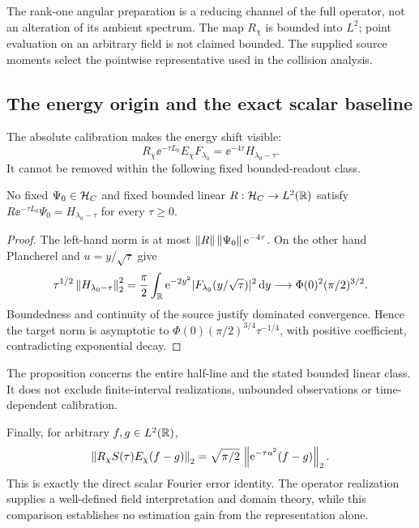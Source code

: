 The rank-one angular preparation is a reducing channel of the full
operator, not an alteration of its ambient spectrum. The map \(R_\chi\)
is bounded into \(L^2\); point evaluation on an arbitrary field is not
claimed bounded. The supplied source moments select the pointwise
representative used in the collision analysis.

\subsection{The energy origin and the exact scalar baseline}
The absolute calibration makes the energy shift visible:
\[
 R_\chi\ee^{-\tau L_0}E_\chi F_{\lambda_0}
 =\ee^{-4\tau}H_{\lambda_0-\tau}.
\]
It cannot be removed within the following fixed bounded-readout class.

\begin{proposition}\label{prop:unshifted}
No fixed \(\Psi_0\in\mathcal H_C\) and fixed bounded linear
\(R:\mathcal H_C\to L^2(\mathbb R)\) satisfy
\(R\ee^{-\tau L_0}\Psi_0=H_{\lambda_0-\tau}\) for every \(\tau\geq0\).
\end{proposition}
\begin{proof}
The left-hand norm is at most \(\left\lVert R\right\rVert\left\lVert\Psi_0\right\rVert\mathrm e^{-4\tau}\).
On the other hand Plancherel and \(u=y/\sqrt\tau\) give
\[
 \tau^{1/2}\left\lVert H_{\lambda_0-\tau}\right\rVert_2^2
 =\frac\pi2\int_\mathbb R\mathrm e^{-2y^2}
 |F_{\lambda_0}(y/\sqrt\tau)|^2\,\mathrm d y
 \longrightarrow\Phi(0)^2(\pi/2)^{3/2}.
\]
Boundedness and continuity of the source justify dominated convergence.
Hence the target norm is asymptotic to
\(\Phi(0)(\pi/2)^{3/4}\tau^{-1/4}\), with positive coefficient,
contradicting exponential decay.
\end{proof}
The proposition concerns the entire half-line and the stated bounded
linear class. It does not exclude finite-interval realizations,
unbounded observations or time-dependent calibration.

Finally, for arbitrary \(f,g\in L^2(\mathbb R)\),
\begin{equation}\label{eq:exact-error}
 \left\lVert R_\chi S(\tau)E_\chi(f-g)\right\rVert_2
 =\sqrt{\pi/2}\,\left\lVert\mathrm e^{-\tau u^2}(f-g)\right\rVert_2.
\end{equation}
This is exactly the direct scalar Fourier error identity. The operator
realization supplies a well-defined field interpretation and domain
theory, while this comparison establishes no estimation gain from the
representation alone.
